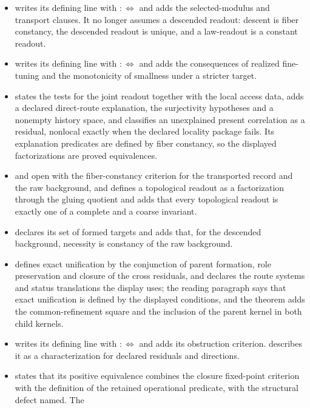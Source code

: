 \begin{itemize}
  minimality clause and defines its locality predicates as factorizations.
\item {} writes its defining line with \(:\Longleftrightarrow\)
  and adds the selected-modulus and transport clauses. It no longer assumes a
  descended readout: descent is fiber constancy, the descended readout is
  unique, and a law-readout is a constant readout.
\item {} writes its defining line with \(:\Longleftrightarrow\)
  and adds the consequences of realized fine-tuning and the monotonicity of
  smallness under a stricter target.
\item {} states the tests for the joint readout together with the
  local access data, adds a declared direct-route explanation, the
  surjectivity hypotheses and a nonempty history space, and classifies an
  unexplained present correlation as a residual, nonlocal exactly when the
  declared locality package fails. Its explanation predicates are defined by
  fiber constancy, so the displayed factorizations are proved equivalences.
\item {} and  open with the fiber-constancy
  criterion for the transported record and the raw background, and
   defines a topological readout as a factorization through the
  gluing quotient and adds that every topological readout is exactly one of a
  complete and a coarse invariant.
\item {} declares its set of formed targets and adds that, for the
  descended background, necessity is constancy of the raw background.
\item {} defines exact unification by the conjunction of
  parent formation, role preservation and closure of the cross residuals, and
  declares the route systems and status translations the display uses; the
  reading paragraph says that exact unification is defined by the displayed
  conditions, and the theorem adds the common-refinement square and the
  inclusion of the parent kernel in both child kernels.
\item {} writes its defining line with \(:\Longleftrightarrow\)
  and adds its obstruction criterion.  describes it as a characterization for declared residuals and directions.
\item {} states that its positive equivalence combines the
  closure fixed-point criterion with the definition of the retained operational predicate, with
  the structural defect named. The

\end{itemize}
